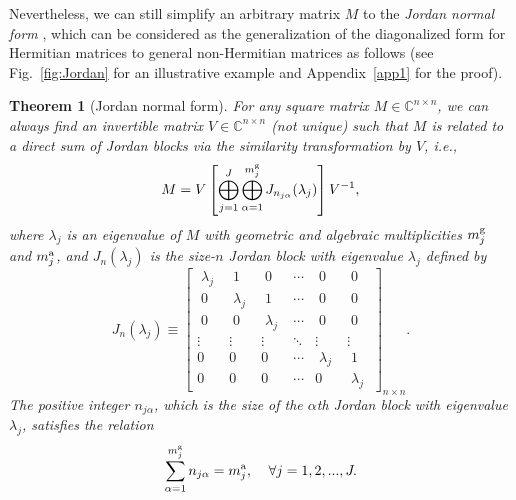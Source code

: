\documentclass{tADP2e}
\theoremstyle{plain}
\theoremstyle{plain}
\newtheorem{theorem}{Theorem}[section]
\theoremstyle{definition}
\newcommand{\thm}[1]{
\begin{theorem}
	#1
\end{theorem}
}
\begin{document}
Nevertheless, we can still simplify an arbitrary matrix $M$ to the {\it Jordan normal form} \cite{CDM00}, which can be considered as the generalization of the diagonalized form for Hermitian matrices to general non-Hermitian matrices as follows (see Fig.~\ref{fig:Jordan} for an illustrative example and Appendix~\ref{app1} for the proof).
\thm{[Jordan normal form]
\label{Thm:JNF}
For any square matrix $M\in\mathbb{C}^{n\times n}$, we can always find an invertible matrix $V\in\mathbb{C}^{n\times n}$ (not unique) such that $M$ is related to a direct sum of Jordan blocks via the similarity transformation by $V$, i.e.,
\begin{equation}
M=V\left[\bigoplus^J_{j=1}\bigoplus^{m^{\rm g}_j}_{\alpha=1} J_{n_{j\alpha}}(\lambda_j)\right]V^{-1},
\label{JNF}
\end{equation}
where $\lambda_j$ is an eigenvalue of $M$ with geometric and algebraic multiplicities $m^{\rm g}_j$ and $m^{\rm a}_j$, and $J_{n}(\lambda_j)$ is the size-$n$ Jordan block with eigenvalue $\lambda_j$ defined by
\begin{equation}
J_{n}(\lambda_j)\equiv
\begin{bmatrix}  
\;\lambda_j\; & \;1\; & \;0\; & \cdots & \;0\; & \;0\; \\ 
\;0\; & \;\lambda_j\; & \;1\; & \cdots & \;0\; & \;0\; \\ 
\;0\; & \;0\; & \;\lambda_j\; & \cdots & \;0\; & \;0\; \\ 
\vdots & \vdots & \vdots & \ddots & \vdots & \vdots \\ 
0 & 0 & 0 & \cdots & \;\lambda_j\; & \;1\; \\
0 & 0 & 0 & \cdots & 0 & \;\lambda_j\; 
\end{bmatrix}_{n\times n}.\label{njblock}
\end{equation}
The positive integer $n_{j\alpha}$, which is the size of the $\alpha$th Jordan block with eigenvalue $\lambda_j$, satisfies the relation
\begin{equation}
\sum^{m^{\rm g}_j}_{\alpha=1}n_{j\alpha}=m^{\rm a}_j,\;\;\;\;
\forall j=1,2,...,J.\label{jnfrel}
\end{equation}
}

\vspace{5pt}

\end{document}
